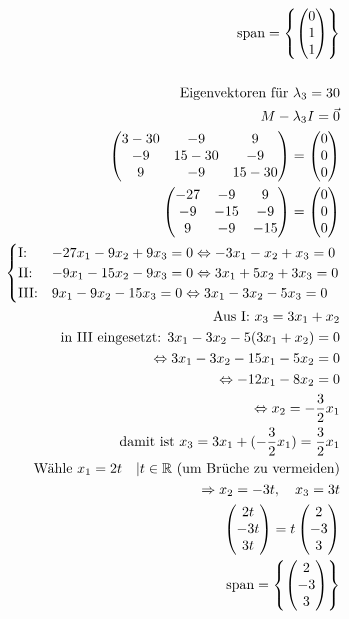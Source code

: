 \begin{align*}
\text{span} = \left\{\begin{pmatrix} 0 \\ 1 \\ 1 \end{pmatrix}\right\} \\\\
\text{Eigenvektoren für } \lambda_3 = 30 \\
M - \lambda_3 I = \vec{0} \\
\begin{pmatrix}
    3 - 30 & -9 & 9 \\ -9 & 15 - 30 & -9 \\ 9 & -9 & 15 - 30
\end{pmatrix} = \begin{pmatrix} 0 \\ 0 \\ 0 \end{pmatrix} \\
\begin{pmatrix}
    -27 & -9 & 9 \\ -9 & -15 & -9 \\ 9 & -9 & -15
\end{pmatrix} = \begin{pmatrix} 0 \\ 0 \\ 0 \end{pmatrix} \\
\begin{cases}
    \text{I:\@} & -27x_1 - 9x_2 + 9x_3 = 0 \Leftrightarrow -3x_1 - x_2 + x_3 = 0 \\
    \text{II:\@} & -9x_1 - 15x_2 - 9x_3 = 0 \Leftrightarrow 3x_1 + 5x_2 + 3x_3 = 0 \\
    \text{III:\@} & 9x_1 - 9x_2 - 15x_3 = 0 \Leftrightarrow 3x_1 - 3x_2 - 5x_3 = 0
\end{cases} \\
\text{Aus I: } x_3 = 3x_1 + x_2 \\
\text{in III eingesetzt: } 3x_1 - 3x_2 - 5(3x_1 + x_2) = 0 \\
\Leftrightarrow 3x_1 - 3x_2 - 15x_1 - 5x_2 = 0 \\
\Leftrightarrow -12x_1 - 8x_2 = 0 \\
\Leftrightarrow x_2 = -\frac{3}{2}x_1 \\
\text{damit ist } x_3 = 3x_1 + (-\frac{3}{2}x_1) = \frac{3}{2}x_1 \\
\text{Wähle } x_1 = 2t \quad | t \in \mathbb{R} \text{ (um Brüche zu vermeiden)} \\
\Rightarrow x_2 = -3t, \quad x_3 = 3t \\
\begin{pmatrix} 2t \\ -3t \\ 3t \end{pmatrix} = t \begin{pmatrix} 2 \\ -3 \\ 3 \end{pmatrix} \\
\text{span} = \left\{\begin{pmatrix} 2 \\ -3 \\ 3 \end{pmatrix}\right\}
\end{align*}
